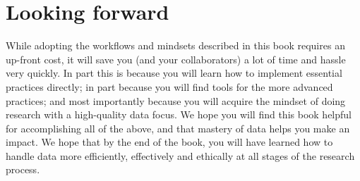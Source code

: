 \section{Looking forward}
While adopting the workflows and mindsets described in this book requires an up-front cost,
it will save you (and your collaborators) a lot of time and hassle very quickly.
In part this is because you will learn how to implement essential practices directly;
in part because you will find tools for the more advanced practices;
and most importantly because you will acquire the mindset of doing research with a high-quality data focus.
We hope you will find this book helpful for accomplishing all of the above,
and that mastery of data helps you make an impact.
We hope that by the end of the book,
you will have learned how to handle data more efficiently, effectively and ethically
at all stages of the research process.

\mainmatter
